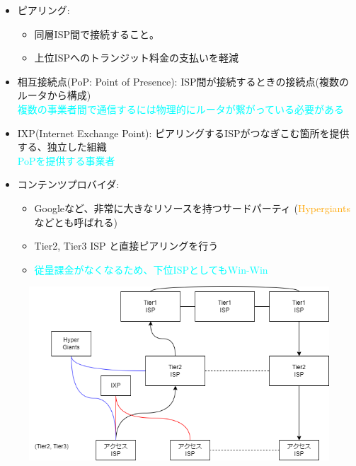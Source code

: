 \begin{itemize}
  \item ピアリング:
  \begin{itemize}
    \item[] 同層ISP間で接続すること。
    \item[] 上位ISPへのトランジット料金の支払いを軽減
  \end{itemize}
  \item  相互接続点(PoP: Point of Presence): ISP間が接続するときの接続点\;(複数のルータから構成)\\
  \textcolor{cyan}{複数の事業者間で通信するには物理的にルータが繋がっている必要がある}
  \item IXP(Internet Exchange Point): ピアリングするISPがつなぎこむ箇所を提供する、独立した組織\\
  \textcolor{cyan}{PoPを提供する事業者}
  \item コンテンツプロバイダ:
  \begin{itemize}
    \item Googleなど、非常に大きなリソースを持つサードパーティ (\textcolor{orange}{Hypergiants}などとも呼ばれる)
    \item Tier2, Tier3 ISP と直接ピアリングを行う
    \item[] \textcolor{cyan}{従量課金がなくなるため、下位ISPとしてもWin-Win}
  \end{itemize}
\end{itemize}

\begin{figure}[h]
  \centering
  \includegraphics[width=0.6\linewidth]{image/isp.png}
\end{figure}
